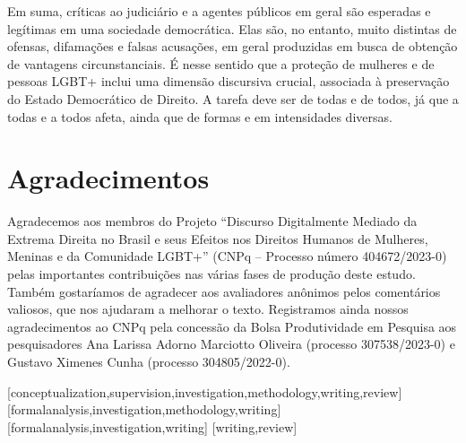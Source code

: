 \documentclass[portuguese]{textolivre}
\begin{document}
Em suma, críticas ao judiciário e a agentes públicos em geral são esperadas e legítimas em uma sociedade democrática. Elas são, no entanto, muito distintas de ofensas, difamações e falsas acusações, em geral produzidas em busca de obtenção de vantagens circunstanciais. É nesse sentido que a proteção de mulheres e de pessoas LGBT+ inclui uma dimensão discursiva crucial, associada à preservação do Estado Democrático de Direito. A tarefa deve ser de todas e de todos, já que a todas e a todos afeta, ainda que de formas e em intensidades diversas.

\section*{Agradecimentos}
Agradecemos aos membros do Projeto ``Discurso Digitalmente Mediado da Extrema Direita no Brasil e seus Efeitos nos Direitos Humanos de Mulheres, Meninas e da Comunidade LGBT+'' (CNPq – Processo número 404672/2023-0) pelas importantes contribuições nas várias fases de produção deste estudo. Também gostaríamos de agradecer aos avaliadores anônimos pelos comentários valiosos, que nos ajudaram a melhorar o texto. Registramos ainda nossos agradecimentos ao CNPq pela concessão da Bolsa Produtividade em Pesquisa aos pesquisadores Ana Larissa Adorno Marciotto Oliveira (processo 307538/2023-0) e Gustavo Ximenes Cunha (processo 304805/2022-0).



\printbibliography\label{sec-bib}


\begin{contributors}
[conceptualization,supervision,investigation,methodology,writing,review]
[formalanalysis,investigation,methodology,writing]
[formalanalysis,investigation,writing]
[writing,review]
\end{contributors}


\
\end{document}
